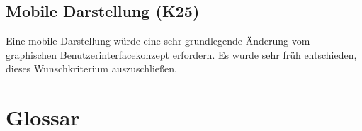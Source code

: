 \documentclass[parskip=full,11pt,twoside]{scrartcl}
\begin{document}

\subsection{Mobile Darstellung (K25)}
    Eine mobile Darstellung würde eine sehr grundlegende Änderung vom graphischen Benutzerinterfacekonzept erfordern.
    Es wurde sehr früh entschieden, dieses Wunschkriterium auszuschließen.

\section{Glossar}
\end{document}

